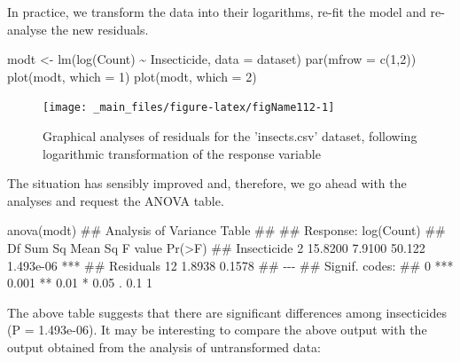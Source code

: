 \documentclass[a4paper,12pt,oneside]{book}
\newenvironment{Shaded}{\begin{snugshade}}{\end{snugshade}}
\newcommand{\DecValTok}[1]{#1}
\newcommand{\SpecialCharTok}[1]{#1}
\newcommand{\DocumentationTok}[1]{#1}
\newcommand{\OtherTok}[1]{#1}
\newcommand{\FunctionTok}[1]{#1}
\newcommand{\AttributeTok}[1]{#1}
\newcommand{\NormalTok}[1]{#1}
\begin{document}
In practice, we transform the data into their logarithms, re-fit the model and re-analyse the new residuals.

\begin{Shaded}
\begin{Highlighting}[]
\NormalTok{modt }\OtherTok{\textless{}{-}} \FunctionTok{lm}\NormalTok{(}\FunctionTok{log}\NormalTok{(Count) }\SpecialCharTok{\textasciitilde{}}\NormalTok{ Insecticide, }\AttributeTok{data =}\NormalTok{ dataset)}
\FunctionTok{par}\NormalTok{(}\AttributeTok{mfrow =} \FunctionTok{c}\NormalTok{(}\DecValTok{1}\NormalTok{,}\DecValTok{2}\NormalTok{))}
\FunctionTok{plot}\NormalTok{(modt, }\AttributeTok{which =} \DecValTok{1}\NormalTok{)}
\FunctionTok{plot}\NormalTok{(modt, }\AttributeTok{which =} \DecValTok{2}\NormalTok{)}
\end{Highlighting}
\end{Shaded}

\begin{figure}

{\centering \texttt{[image: \_main\_files/figure-latex/figName112-1]} 

}

\caption{Graphical analyses of residuals for the 'insects.csv' dataset, following logarithmic transformation of the response variable}\label{fig:figName112}
\end{figure}

The situation has sensibly improved and, therefore, we go ahead with the analyses and request the ANOVA table.

\begin{Shaded}
\begin{Highlighting}[]
\FunctionTok{anova}\NormalTok{(modt)}
\DocumentationTok{\#\# Analysis of Variance Table}
\DocumentationTok{\#\# }
\DocumentationTok{\#\# Response: log(Count)}
\DocumentationTok{\#\#             Df  Sum Sq Mean Sq F value    Pr(\textgreater{}F)    }
\DocumentationTok{\#\# Insecticide  2 15.8200  7.9100  50.122 1.493e{-}06 ***}
\DocumentationTok{\#\# Residuals   12  1.8938  0.1578                      }
\DocumentationTok{\#\# {-}{-}{-}}
\DocumentationTok{\#\# Signif. codes:  }
\DocumentationTok{\#\# 0 \textquotesingle{}***\textquotesingle{} 0.001 \textquotesingle{}**\textquotesingle{} 0.01 \textquotesingle{}*\textquotesingle{} 0.05 \textquotesingle{}.\textquotesingle{} 0.1 \textquotesingle{} \textquotesingle{} 1}
\end{Highlighting}
\end{Shaded}

The above table suggests that there are significant differences among insecticides (P = 1.493e-06). It may be interesting to compare the above output with the output obtained from the analysis of untransformed data:
\end{document}
